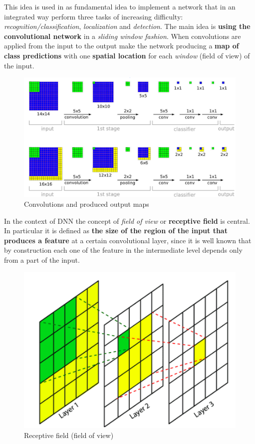 This idea is used in \cite{sermanet_overfeat_2014} as fundamental idea to implement a network that in an integrated way perform three tasks of increasing difficulty: \textit{recognition/classification}, \textit{localization} and \textit{detection}. The main idea is \textbf{using the convolutional network} in a \textit{sliding window fashion}. When convolutions are applied from the input to the output make the network producing a \textbf{map of class predictions} with one \textbf{spatial location} for each \textit{window} (field of view) of the input.

\begin{figure}[h]\label{fig: OverFeat_1}
    \centering
    \includegraphics[scale=0.5]{img/OverFeat.png}
    \caption{Convolutions and produced output maps}
\end{figure}

\noindent
In the context of DNN the concept of \textit{field of view} or \textbf{receptive field} is central. In particular it is defined as \textbf{the size of the region of the input that produces a feature} at a certain convolutional layer, since it is well known that by construction each one of the feature in the intermediate level depends only from a part of the input.

\begin{figure}[h]
    \centering
    \includegraphics[scale=0.3]{img/ReceptiveFields.png}
    \caption{Receptive field (field of view)}
\end{figure}

